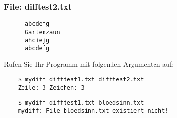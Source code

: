 \documentclass{article}
\begin{document}
\subsubsection*{File: difftest2.txt}
\begin{verbatim}
      abcdefg
      Gartenzaun
      ahciejg
      abcdefg
\end{verbatim}
    Rufen Sie Ihr Programm mit folgenden Argumenten auf:
\begin{verbatim}
    $ mydiff difftest1.txt difftest2.txt
    Zeile: 3 Zeichen: 3
\end{verbatim}
\begin{verbatim}
    $ mydiff difftest1.txt bloedsinn.txt
    mydiff: File bloedsinn.txt existiert nicht!
\end{verbatim}
\end{document}
